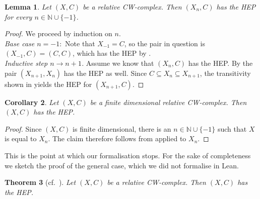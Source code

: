 \documentclass[11pt, a4paper, english]{article}
\theoremstyle{plain}
\newtheorem{theorem}{Theorem}
\newtheorem{lemma}[theorem]{Lemma}
\newtheorem{corollary}[theorem]{Corollary}
\theoremstyle{definition}
\theoremstyle{remark}
\numberwithin{equation}{section}
\numberwithin{theorem}{section}
\begin{document}
\begin{lemma}\label{lem:HEPrelskel}
    Let $(X,C)$ be a relative CW-complex. Then $(X_n,C)$ has the HEP for every $n \in \mathbb{N} \cup \{-1\}$.
\end{lemma}
\begin{proof}
    We proceed by induction on $n$. \\
    \emph{Base case $n = -1 \colon$} Note that $X_{-1} = C$, so the pair in question is $(X_{-1},C) = (C,C)$, which has the HEP by . \\
    \emph{Inductive step $n \to n+1$.} Assume we know that $(X_n,C)$ has the HEP. By  the pair $(X_{n+1}, X_n)$ has the HEP as well. Since $C \subseteq X_n \subseteq X_{n+1}$, the transitivity shown in  yields the HEP for $(X_{n+1}, C)$.
\end{proof}

\begin{corollary} \label{cor:HEPfiniteCW}
    Let $(X,C)$ be a finite dimensional relative CW-complex. Then $(X,C)$ has the HEP.
\end{corollary}

\begin{proof}
    Since $(X,C)$ is finite dimensional, there is an $n \in \mathbb{N} \cup \{-1\}$ such that $X$ is equal to $X_n$. The claim therefore follows from  applied to $X_n$.
\end{proof}

This is the point at which our formalisation stops. For the sake of completeness we sketch the proof of the general case, which we did not formalise in Lean. 
\begin{theorem}  [cf.\ {\cite[page 40 f.]{WAL}}] \label{HEP_CW}
    Let $(X,C)$ be a relative CW-complex. Then $(X,C)$ has the HEP.
\end{theorem}
\end{document}
